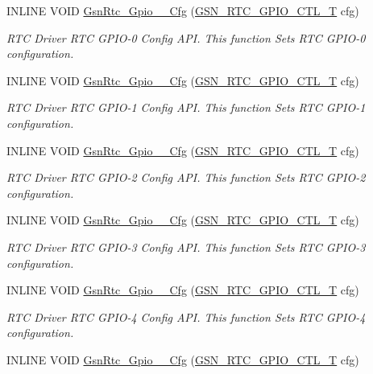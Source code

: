 \begin{DoxyCompactItemize}
INLINE VOID \hyperlink{a00651_gac9cef74b21e7fdac330f246e7ff778fb}{GsnRtc\_\-Gpio\_\_\-Cfg} (\hyperlink{a00651_gaac2b2cc7a6f64a96caddc19f3b3df78b}{GSN\_\-RTC\_\-GPIO\_\-CTL\_\-T} cfg)
\begin{DoxyCompactList}\small\item\em RTC Driver RTC GPIO-\/0 Config API. This function Sets RTC GPIO-\/0 configuration. \end{DoxyCompactList}\item 
INLINE VOID \hyperlink{a00651_ga2c81792265698c13ab7088ba3195e08e}{GsnRtc\_\-Gpio\_\_\-Cfg} (\hyperlink{a00651_gaac2b2cc7a6f64a96caddc19f3b3df78b}{GSN\_\-RTC\_\-GPIO\_\-CTL\_\-T} cfg)
\begin{DoxyCompactList}\small\item\em RTC Driver RTC GPIO-\/1 Config API. This function Sets RTC GPIO-\/1 configuration. \end{DoxyCompactList}\item 
INLINE VOID \hyperlink{a00651_ga7d27ee4a3acaf387ff12a497d7ae2120}{GsnRtc\_\-Gpio\_\_\-Cfg} (\hyperlink{a00651_gaac2b2cc7a6f64a96caddc19f3b3df78b}{GSN\_\-RTC\_\-GPIO\_\-CTL\_\-T} cfg)
\begin{DoxyCompactList}\small\item\em RTC Driver RTC GPIO-\/2 Config API. This function Sets RTC GPIO-\/2 configuration. \end{DoxyCompactList}\item 
INLINE VOID \hyperlink{a00651_ga3cdaf161d94738dcd5f84a2b38a52c92}{GsnRtc\_\-Gpio\_\_\-Cfg} (\hyperlink{a00651_gaac2b2cc7a6f64a96caddc19f3b3df78b}{GSN\_\-RTC\_\-GPIO\_\-CTL\_\-T} cfg)
\begin{DoxyCompactList}\small\item\em RTC Driver RTC GPIO-\/3 Config API. This function Sets RTC GPIO-\/3 configuration. \end{DoxyCompactList}\item 
INLINE VOID \hyperlink{a00651_gac809bed7d40c3c9feb0cda54de5860d2}{GsnRtc\_\-Gpio\_\_\-Cfg} (\hyperlink{a00651_gaac2b2cc7a6f64a96caddc19f3b3df78b}{GSN\_\-RTC\_\-GPIO\_\-CTL\_\-T} cfg)
\begin{DoxyCompactList}\small\item\em RTC Driver RTC GPIO-\/4 Config API. This function Sets RTC GPIO-\/4 configuration. \end{DoxyCompactList}\item 
INLINE VOID \hyperlink{a00651_ga799fcbbbd4834b39baee8d35767872d2}{GsnRtc\_\-Gpio\_\_\-Cfg} (\hyperlink{a00651_gaac2b2cc7a6f64a96caddc19f3b3df78b}{GSN\_\-RTC\_\-GPIO\_\-CTL\_\-T} cfg)

\end{DoxyCompactItemize}
